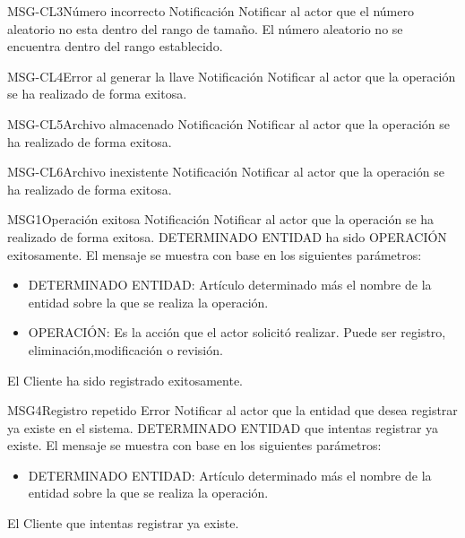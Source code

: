 \begin{Message}{MSG-CL3}{Número incorrecto} 
	\MSGitem[Tipo: ] Notificación
	\MSGitem[Objetivo: ] Notificar al actor que el número aleatorio no esta dentro del rango de tamaño.
	\MSGitem[Redacción: ] El número aleatorio no se encuentra dentro del rango establecido. 
	\MSGitem[Ejemplo: ] 
\end{Message}

\begin{Message}{MSG-CL4}{Error al generar la llave} 
	\MSGitem[Tipo: ] Notificación
	\MSGitem[Objetivo: ] Notificar al actor que la operación se ha realizado de forma exitosa.
	\MSGitem[Redacción: ]
	\MSGitem[Ejemplo: ] 
\end{Message}

\begin{Message}{MSG-CL5}{Archivo almacenado} 
	\MSGitem[Tipo: ] Notificación
	\MSGitem[Objetivo: ] Notificar al actor que la operación se ha realizado de forma exitosa.
	\MSGitem[Redacción: ]
	\MSGitem[Ejemplo: ] 
\end{Message}

\begin{Message}{MSG-CL6}{Archivo inexistente} 
	\MSGitem[Tipo: ] Notificación
	\MSGitem[Objetivo: ] Notificar al actor que la operación se ha realizado de forma exitosa.
	\MSGitem[Redacción: ]
	\MSGitem[Ejemplo: ] 
\end{Message}

\begin{Message}{MSG1}{Operación exitosa} 
	\MSGitem[Tipo: ] Notificación
	\MSGitem[Objetivo: ] Notificar al actor que la operación se ha realizado de forma exitosa.
	\MSGitem[Redacción: ] DETERMINADO ENTIDAD ha sido OPERACIÓN exitosamente. 
	\MSGitem[Parámetros: ] El mensaje se muestra con base en los siguientes parámetros:
		\begin{itemize}	
			\item DETERMINADO ENTIDAD: Artículo determinado más el nombre de la entidad sobre la que se realiza la operación.
			\item OPERACIÓN: Es la acción que el actor solicitó realizar. Puede ser registro,  eliminación,modificación o revisión.
		\end{itemize}		
	\MSGitem[Ejemplo: ] El Cliente ha sido registrado exitosamente.
\end{Message}

\begin{Message}{MSG4}{Registro repetido} 
	\MSGitem[Tipo: ] Error
	\MSGitem[Objetivo: ] Notificar al actor que la entidad que desea registrar ya existe en el sistema.
	\MSGitem[Redacción: ] DETERMINADO ENTIDAD que intentas registrar ya existe.
	\MSGitem[Parámetros: ] El mensaje se muestra con base en los siguientes parámetros:
		\begin{itemize}	
			\item DETERMINADO ENTIDAD: Artículo determinado más el nombre de la entidad sobre la que se realiza la operación.
		\end{itemize}		
	\MSGitem[Ejemplo: ] El Cliente que intentas registrar ya existe.
\end{Message}

